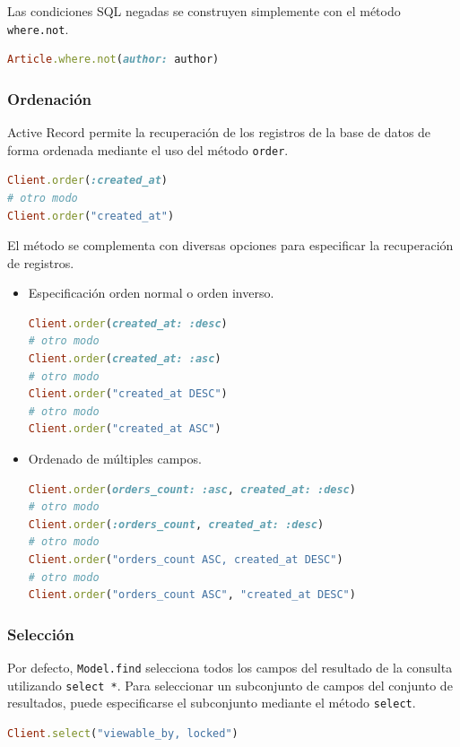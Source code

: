 Las condiciones SQL negadas se construyen simplemente con el método \texttt{where.not}.

\begin{lstlisting}[language=Ruby]
Article.where.not(author: author)
\end{lstlisting}


\subsubsection{Ordenación}
Active Record permite la recuperación de los registros de la base de datos de forma ordenada mediante el uso del método \texttt{order}.

\begin{lstlisting}[language=Ruby]
Client.order(:created_at)
# otro modo
Client.order("created_at")
\end{lstlisting}

El método se complementa con diversas opciones para especificar la recuperación de registros.
\begin{itemize}
\item Especificación orden normal o orden inverso.
\begin{lstlisting}[language=Ruby]
Client.order(created_at: :desc)
# otro modo
Client.order(created_at: :asc)
# otro modo
Client.order("created_at DESC")
# otro modo
Client.order("created_at ASC")
\end{lstlisting}

\item Ordenado de múltiples campos.
\begin{lstlisting}[language=Ruby]
Client.order(orders_count: :asc, created_at: :desc)
# otro modo
Client.order(:orders_count, created_at: :desc)
# otro modo
Client.order("orders_count ASC, created_at DESC")
# otro modo
Client.order("orders_count ASC", "created_at DESC")
\end{lstlisting}
\end{itemize}


\subsubsection{Selección}
Por defecto, \texttt{Model.find} selecciona todos los campos del resultado de la consulta utilizando \texttt{select *}. Para seleccionar un subconjunto de campos del conjunto de resultados, puede especificarse el subconjunto mediante el método \texttt{select}.

\begin{lstlisting}[language=Ruby]
Client.select("viewable_by, locked")
\end{lstlisting}

